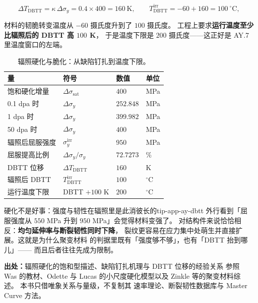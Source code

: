 \begin{equation}
\Delta T_\mathrm{DBTT}=\kappa\,\Delta\sigma_y
=0.4\times400=160\ \mathrm{K},
\qquad
T_\mathrm{DBTT}^\mathrm{irr}=-60+160=100\ ^\circ\mathrm{C},
\label{eq:app-ay-dbtt}
\end{equation}

材料的韧脆转变温度从 $-60$ 摄氏度升到了 $100$ 摄氏度。
工程上要求\textbf{运行温度至少比辐照后的 DBTT 高 $100$ K}，
于是温度下限是 $200$ 摄氏度——这正好是 AY.7 里温度窗口的左端。

\begin{table}[htbp]
\centering
\small
\setlength{\tabcolsep}{4pt}
\caption{辐照硬化与脆化：从缺陷钉扎到温度下限。}
\label{tab:app-ay-hard}
\begin{tabular}{p{4.6cm}p{2.8cm}p{3.0cm}p{2.6cm}}
\toprule
量 & 符号 & 数值 & 单位 \\
\midrule
饱和硬化增量 & $\Delta\sigma_\mathrm{sat}$ & $400$ & MPa \\
0.1 dpa 时 & $\Delta\sigma_y$ & $252.848$ & MPa \\
1 dpa 时 & $\Delta\sigma_y$ & $399.982$ & MPa \\
50 dpa 时 & $\Delta\sigma_y$ & $400$ & MPa \\
辐照后屈服强度 & $\sigma_y^\mathrm{irr}$ & $950$ & MPa \\
屈服提高比例 & $\Delta\sigma_y/\sigma_y$ & $72.7273$ & \% \\
DBTT 位移 & $\Delta T_\mathrm{DBTT}$ & $160$ & K \\
辐照后 DBTT & $T_\mathrm{DBTT}^\mathrm{irr}$ & $100$ & $^\circ$C \\
运行温度下限 & DBTT $+100$ K & $200$ & $^\circ$C \\
\bottomrule
\end{tabular}

\end{table}

\begin{tip}{硬化不是好事：强度与韧性在辐照里是此消彼长的}{tip-app-ay-dbtt}
外行看到「屈服强度从 $550$ MPa 升到 $950$ MPa」会觉得材料变强了。
对结构件来说恰恰相反：\textbf{均匀延伸率与断裂韧性同时下降}，
裂纹更容易在应力集中处萌生并直接扩展。这就是为什么聚变材料
的判据里既有「强度够不够」，也有「DBTT 抬到哪儿」——
而且后者往往先成为限制。
\end{tip}

{\footnotesize
\textbf{出处：}辐照硬化的饱和型描述、缺陷钉扎机理与 DBTT 位移的经验关系
参照 Was 的教材、Odette 与 Lucas 的小尺度硬化模型以及
Zinkle 等的聚变材料综述。
本书只借唯象关系与量级，不复制其
速率理论、断裂韧性数据库与 Master Curve 方法。
}

